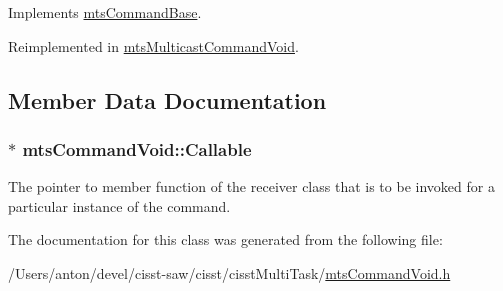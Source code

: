 Implements \hyperlink{classmts_command_base_a0885ce7a5321d7b672694ade780b9d64}{mts\+Command\+Base}.



Reimplemented in \hyperlink{classmts_multicast_command_void_a8d3442e9f633665c9e465c351432c82e}{mts\+Multicast\+Command\+Void}.



\subsection{Member Data Documentation}
\hypertarget{classmts_command_void_aece6de22d32c402ea6f4baf428d56a05}{}
\subsubsection[{Callable}]{$\ast$ mts\+Command\+Void\+::\+Callable\hspace{0.3cm}{\ttfamily [protected]}}\label{classmts_command_void_aece6de22d32c402ea6f4baf428d56a05}
The pointer to member function of the receiver class that is to be invoked for a particular instance of the command. 

The documentation for this class was generated from the following file\+:\begin{DoxyCompactItemize}
\item 
/\+Users/anton/devel/cisst-\/saw/cisst/cisst\+Multi\+Task/\hyperlink{mts_command_void_8h}{mts\+Command\+Void.\+h}\end{DoxyCompactItemize}
